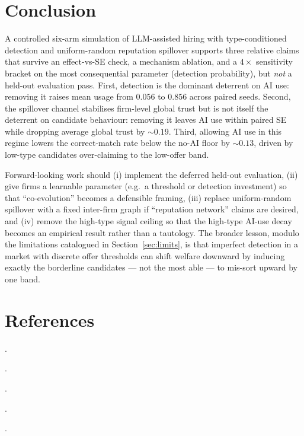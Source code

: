 \documentclass[11pt]{article}
\begin{document}
\section{Conclusion}

A controlled six-arm simulation of LLM-assisted hiring with type-conditioned
detection and uniform-random reputation spillover supports three relative
claims that survive an effect-vs-SE check, a mechanism ablation, and a
\(4\times\) sensitivity bracket on the most consequential parameter
(detection probability), but \emph{not} a held-out evaluation pass. First,
detection is the dominant deterrent on AI use:
removing it raises mean usage from \(0.056\) to \(0.856\) across paired
seeds. Second, the spillover channel stabilises firm-level global trust
but is not itself the deterrent on candidate behaviour: removing it leaves
AI use within paired SE while dropping average global trust by \(\sim 0.19\).
Third, allowing AI use in this regime lowers the correct-match rate below the
no-AI floor by \(\sim 0.13\), driven by low-type candidates over-claiming
to the low-offer band.

Forward-looking work should (i) implement the deferred held-out evaluation,
(ii) give firms a learnable parameter (e.g.\ a threshold or detection
investment) so that ``co-evolution'' becomes a defensible framing,
(iii) replace uniform-random spillover with a fixed inter-firm graph if
``reputation network'' claims are desired, and (iv) remove the high-type
signal ceiling so that the high-type AI-use decay becomes an empirical
result rather than a tautology. The broader lesson, modulo the limitations
catalogued in Section~\ref{sec:limits}, is that imperfect detection in a
market with discrete offer thresholds can shift welfare downward by
inducing exactly the borderline candidates --- not the most able --- to
mis-sort upward by one band.

\section*{References}


.

.

.

.

.
\end{document}
